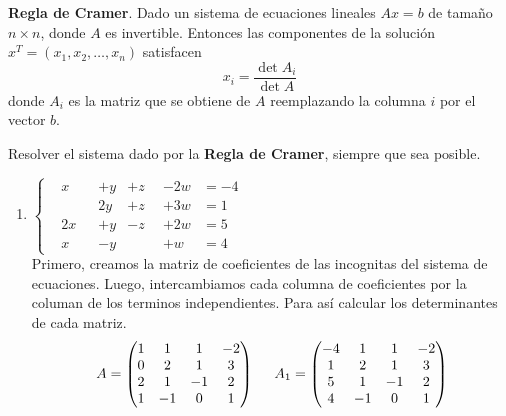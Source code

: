 \begin{definition}
    \textbf{Regla de Cramer}.
    Dado un sistema de ecuaciones lineales \(Ax = b\) de tamaño \(n \times n\), donde \(A\) es invertible.
    Entonces las componentes de la solución \(x^T = \left(x_1 , x_2 , \ldots , x_n \right)\) satisfacen
    \[
        x_i = \frac{\det A_i}{\det A}
    \]
    donde \(A_i\) es la matriz que se obtiene de \(A\) reemplazando la columna \(i\) por el vector \(b\).
\end{definition}
\item Resolver el sistema dado por la \textbf{Regla de Cramer}, siempre que sea posible.
    \begin{enumerate}[label=\listAlph]
        \item 
            \(
                \left\{
                \begin{aligned}
                    &x &+y &+z &-2w &= -4 \\
                    &\phantom{+0x} &2y &+z &+3w &= 1 \\
                    &2x &+y &-z &+2w &= 5 \\
                    &x &-y &\phantom{+0z} &+w &= 4
                \end{aligned}
                \right.
            \) \\
            Primero, creamos la matriz de coeficientes de las incognitas del sistema de ecuaciones. 
            Luego, intercambiamos cada columna de coeficientes por la columan de los terminos independientes.
            Para así calcular los determinantes de cada matriz.
            \[
                A = 
                \begin{pmatrix}
                    1 & 1 & 1 & -2 \\
                    0 & 2 & 1 & 3 \\
                    2 & 1 & -1 & 2 \\
                    1 & -1 & 0 & 1
                \end{pmatrix}
                \hspace{0.5cm}
                A_1 = 
                \begin{pmatrix}
                    -4 & 1 & 1 & -2 \\
                    1 & 2 & 1 & 3 \\
                    5 & 1 & -1 & 2 \\
                    4 & -1 & 0 & 1
                \end{pmatrix}
            \]
            \[
\]
\end{enumerate}
